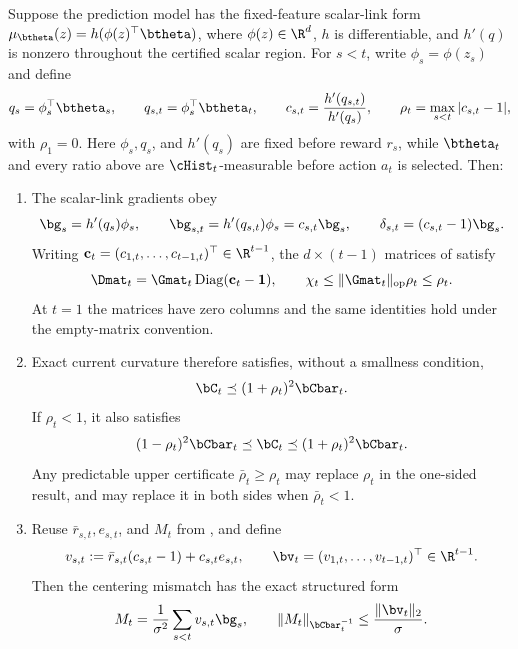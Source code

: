 \begin{lemma}
\label{lem:relative-link-drift}
Suppose the prediction model has the fixed-feature scalar-link form
$\mu_{\btheta}(z)=h(\phi(z)^\top\btheta)$, where
$\phi(z)\in\R^d$, $h$ is differentiable, and $h'(q)$ is nonzero throughout
the certified scalar region.  For $s<t$, write $\phi_s=\phi(z_s)$ and define
\[
 q_s=\phi_s^\top\btheta_s,\qquad
 q_{s,t}=\phi_s^\top\btheta_t,\qquad
 c_{s,t}=\frac{h'(q_{s,t})}{h'(q_s)},\qquad
 \rho_t=\max_{s<t}|c_{s,t}-1|,
\]
with $\rho_1=0$.  Here $\phi_s,q_s$, and $h'(q_s)$ are fixed before reward
$r_s$, while $\btheta_t$ and every ratio above are $\cHist_t$-measurable
before action $a_t$ is selected.  Then:
\begin{enumerate}[nosep,label=(\alph*),leftmargin=1.6em]
\item The scalar-link gradients obey
\begin{equation}\label{eq:relative-link-gradients}
 \bg_s=h'(q_s)\phi_s,\qquad
 \bg_{s,t}=h'(q_{s,t})\phi_s=c_{s,t}\bg_s,\qquad
 \delta_{s,t}=(c_{s,t}-1)\bg_s.
\end{equation}
Writing $\mathbf c_t=(c_{1,t},\ldots,c_{t-1,t})^\top\in\R^{t-1}$, the
$d\times(t-1)$ matrices of  satisfy
\begin{equation}\label{eq:relative-link-D}
 \Dmat_t=\Gmat_t\operatorname{Diag}(\mathbf c_t-\mathbf{1}),\qquad
 \chi_t\le\|\Gmat_t\|_{\rm op}\rho_t\le\rho_t.
\end{equation}
At $t=1$ the matrices have zero columns and the same identities hold under the
empty-matrix convention.

\item Exact current curvature therefore satisfies, without a smallness
condition,
\begin{equation}\label{eq:relative-link-transfer}
 \bC_t\preceq(1+\rho_t)^2\bCbar_t.
\end{equation}
If $\rho_t<1$, it also satisfies
\begin{equation}\label{eq:relative-link-sandwich}
 (1-\rho_t)^2\bCbar_t\preceq\bC_t
 \preceq(1+\rho_t)^2\bCbar_t.
\end{equation}
Any predictable upper certificate $\bar\rho_t\ge\rho_t$ may replace $\rho_t$
in the one-sided result, and may replace it in both sides when
$\bar\rho_t<1$.

\item Reuse $\bar r_{s,t},e_{s,t}$, and $M_t$ from
, and define
\begin{equation}\label{eq:relative-link-v}
 v_{s,t}:=\bar r_{s,t}(c_{s,t}-1)+c_{s,t}e_{s,t},\qquad
 \bv_t=(v_{1,t},\ldots,v_{t-1,t})^\top\in\R^{t-1}.
\end{equation}
Then the centering mismatch has the exact structured form
\begin{equation}\label{eq:relative-link-M}
 M_t=\frac1{\sigma^2}\sum_{s<t}v_{s,t}\bg_s,\qquad
 \|M_t\|_{\bCbar_t^{-1}}\le\frac{\|\bv_t\|_2}{\sigma}.
\end{equation}


\end{enumerate}
\end{lemma}
